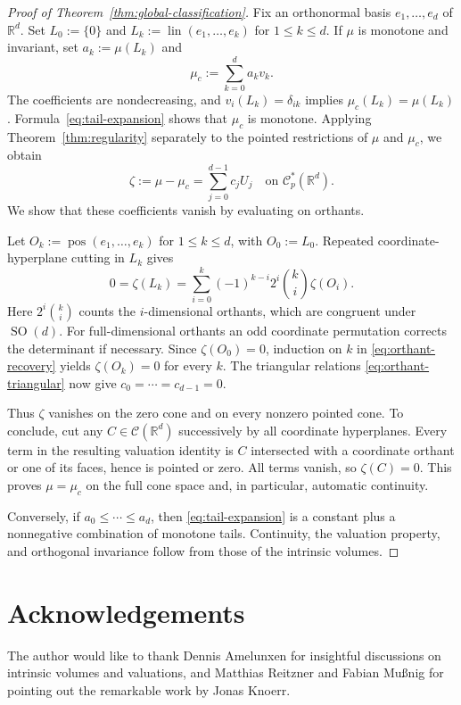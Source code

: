 \documentclass[11pt]{article}
\newcommand{\R}{\mathbb{R}}
\newcommand{\CC}{\mathcal{C}}
\newcommand{\SOn}[1]{\operatorname{SO}(#1)}
\newcommand{\vct}[1]{#1}
\newcommand{\zero}{\vct{0}}
\newcommand{\pos}{\operatorname{pos}}
\newcommand{\lin}{\operatorname{lin}}
\theoremstyle{plain}
\theoremstyle{definition}
\begin{document}
\begin{proof}[Proof of Theorem~\ref{thm:global-classification}]
Fix an orthonormal basis $e_1,\ldots,e_d$ of $\R^d$.
Set $L_0:=\{\zero\}$ and $L_k:=\lin(e_1,\ldots,e_k)$ for $1\le k\le d$.
If $\mu$ is monotone and invariant, set $a_k:=\mu(L_k)$ and
\[
  \mu_c:=\sum_{k=0}^{d}a_kv_k.
\]
The coefficients are nondecreasing, and $v_i(L_k)=\delta_{ik}$ implies
$\mu_c(L_k)=\mu(L_k)$.  Formula~\eqref{eq:tail-expansion} shows that
$\mu_c$ is monotone.  Applying Theorem~\ref{thm:regularity} separately
to the pointed restrictions of $\mu$ and $\mu_c$, we obtain
\[
  \zeta:=\mu-\mu_c=\sum_{j=0}^{d-1}c_jU_j
  \quad\text{on }\CC_p^*(\R^d).
\]
We show that these coefficients vanish by evaluating on orthants.

Let $O_k:=\pos(e_1,\ldots,e_k)$ for $1\le k\le d$, with $O_0:=L_0$.
Repeated coordinate-hyperplane cutting in $L_k$ gives
\begin{equation}\label{eq:orthant-recovery}
  0=\zeta(L_k)
   =\sum_{i=0}^{k}(-1)^{k-i}2^i\binom{k}{i}\zeta(O_i).
\end{equation}
Here $2^i\binom{k}{i}$ counts the $i$-dimensional orthants, which are
congruent under $\SOn d$. For full-dimensional orthants an odd
coordinate permutation corrects the determinant if necessary.
Since $\zeta(O_0)=0$, induction on $k$ in
\eqref{eq:orthant-recovery} yields $\zeta(O_k)=0$ for every $k$.
The triangular relations \eqref{eq:orthant-triangular} now give
$c_0=\cdots=c_{d-1}=0$.

Thus $\zeta$ vanishes on the zero cone and on every nonzero pointed
cone.  To conclude, cut any $C\in\CC(\R^d)$ successively by all
coordinate hyperplanes.  Every term in the resulting valuation identity
is $C$ intersected with a coordinate orthant or one of its faces, hence
is pointed or zero.  All terms vanish, so $\zeta(C)=0$.
This proves $\mu=\mu_c$ on the full cone space and, in particular,
automatic continuity.

Conversely, if $a_0\le\cdots\le a_d$, then
\eqref{eq:tail-expansion} is a constant plus a nonnegative combination
of monotone tails.
Continuity, the valuation property, and orthogonal invariance follow
from those of the intrinsic volumes.
\end{proof}

\section*{Acknowledgements}
The author would like to thank Dennis Amelunxen for insightful discussions on
intrinsic volumes and valuations, and Matthias Reitzner and Fabian Mu\ss nig for
pointing out the remarkable work by Jonas Knoerr.
\end{document}
